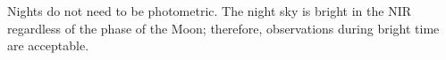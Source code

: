 \documentclass[11pt]{article}
\begin{document}
Nights do not need to be photometric. 
The night sky is bright in the NIR regardless of the phase of the Moon; therefore, observations during bright time are acceptable. 

%
%

\begin{configuration}
\grating{}
\order{}
\crossdisperser{}       
\slit{}
\multislit{}            
\wstart{}
\wend{}
\cable{}
\corrector{}            
\collimator{}             
\adc{}
\end{configuration}



%
%




\specialrequest
\end{document}
